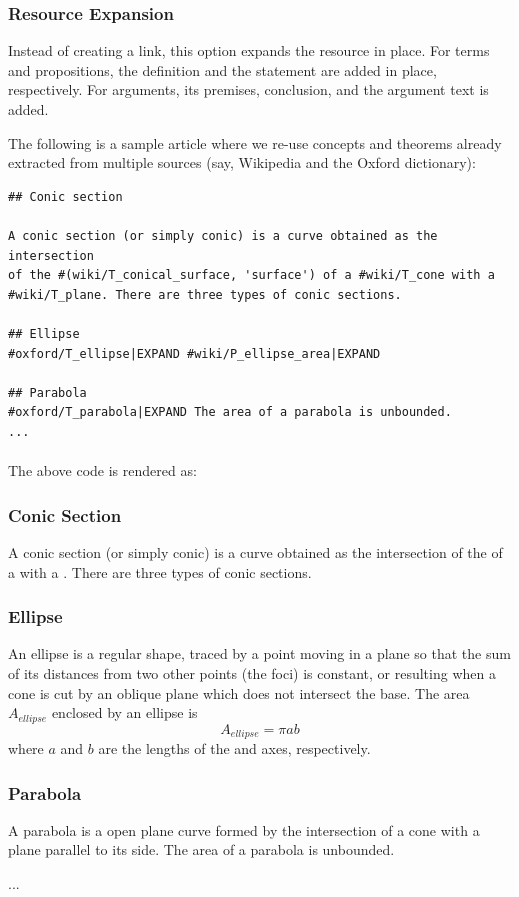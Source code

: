 \documentclass[]{ceurart}
\begin{document}
\subsubsection{Resource Expansion}

Instead of creating a link, this option expands the resource in place. For terms and propositions, the definition and the statement are added in place, respectively. For arguments, its premises, conclusion, and the argument text is added.

The following is a sample article where we re-use concepts and theorems already extracted from multiple sources (say, Wikipedia and the Oxford dictionary):

\begin{verbatim}
## Conic section

A conic section (or simply conic) is a curve obtained as the intersection
of the #(wiki/T_conical_surface, 'surface') of a #wiki/T_cone with a 
#wiki/T_plane. There are three types of conic sections.

## Ellipse
#oxford/T_ellipse|EXPAND #wiki/P_ellipse_area|EXPAND

## Parabola
#oxford/T_parabola|EXPAND The area of a parabola is unbounded.
...
\end{verbatim}

\paragraph{}The above code is rendered as:

\begin{mdframed}
\subsubsection*{Conic Section}
A conic section (or simply conic) is a curve obtained as the intersection of the  of a  with a . There are three types of conic sections.

\subsubsection*{Ellipse}
An ellipse is a regular  shape, traced by a point moving in a plane so that the sum of its distances from two other points (the foci) is constant, or resulting when a cone is cut by an oblique plane which does not intersect the base.  The area $A_{ellipse}$ enclosed by an ellipse is $$A_{ellipse} = \pi a b$$where $a$ and $b$ are the lengths of the  and  axes, respectively.


\subsubsection*{Parabola}

A parabola is a  open plane curve formed by the intersection of a cone with a plane parallel to its side. The area of a parabola is unbounded.

...

\end{mdframed}
\end{document}
